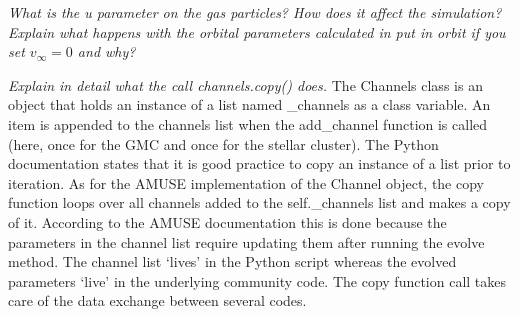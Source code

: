 \documentclass{aa}
\begin{document}
\textit{What is the u parameter on the gas particles? How does it affect the simulation? Explain what happens with the orbital parameters calculated in put in orbit if you set $v_\infty = 0$ and why?}


\textit{Explain in detail what the call channels.copy() does.}
The Channels class is an object that holds an instance of a list named \_channels as a class variable. An item is appended to the channels list when the add\_channel function is called (here, once for the GMC and once for the stellar cluster). The Python documentation states that it is good practice to copy an instance of a list prior to iteration. As for the AMUSE implementation of the Channel object, the copy function loops over all channels added to the self.\_channels list and makes a copy of it. According to the AMUSE documentation this is done because the parameters in the channel list require updating them after running the evolve method. The channel list `lives' in the Python script whereas the evolved parameters `live' in the underlying community code. The copy function call takes care of the data exchange between several codes.
\end{document}
